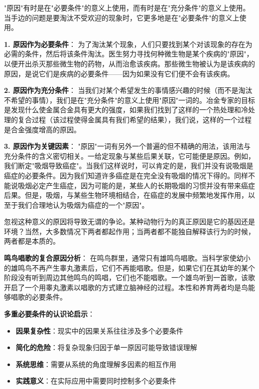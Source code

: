 \begin{theorembox}[title=原因概念的三种基本含义]
"原因"有时是在"必要条件"的意义上使用，而有时是在"充分条件"的意义上使用。当手边的问题是要淘汰不受欢迎的现象时，它更多地是在"必要条件"的意义上使用。

\textbf{1. 原因作为必要条件}：
为了淘汰某个现象，人们只要找到某个对该现象的存在为必需的条件，然后将该条件淘汰。医生努力寻找何种微生物是某个疾病的"原因"，以便开出杀灭那些微生物的药物，从而治愈该疾病。那些微生物被认为是该疾病的原因，是说它们是疾病的必要条件——因为如果没有它们便不会有该疾病。

\textbf{2. 原因作为充分条件}：
当我们对某个希望发生的事情感兴趣的时候（而不是淘汰不希望的事情），我们是在"充分条件"的意义上使用"原因"一词的。冶金专家的目标是发现什么使金属合金具有更大的强度，如果我们找到了这样的一个热处理和冷处理的复合过程（该过程使得金属具有我们希望的结果），我们说，这样的一个过程是合金强度增高的原因。

\textbf{3. 原因作为关键因素}：
"原因"一词有另外一个普遍的但不精确的用法，该用法与充分条件的含义密切相关。一给定现象与某些后果关联，它可能便是原因。例如，我们断定"吸烟导致癌症"。当我们这样说时，可以肯定的是，我们并没有说吸烟是癌症的必要条件。因为我们知道许多癌症是在完全没有吸烟的情况下得的。同样不能说吸烟必定产生癌症，因为可能的是，某些人的长期吸烟的习惯并没有带来癌症后果。但是，吸烟，与某些生物环境相结合，在癌症的发展中频繁地发挥作用，以至于我们合理地认为吸烟为癌症的一个"原因"。
\end{theorembox}

\begin{examplebox}[title=生物学中的多重必要条件案例]
忽视这种意义的原因将导致无谓的争论。某种动物行为的真正原因是它的基因还是环境？当然，大多数情况下两者都起作用；当两者都不能独自解释该行为的时候，两者都是本质的。

\textbf{鸣鸟唱歌的复合原因分析}：
在鸣鸟群里，通常只有雄鸣鸟唱歌。当科学家使幼小的雄鸣鸟不再产生睾丸激素后，它们不再能唱歌。但是，如果它们在其幼年的某个阶段没有听到周边其他鸣鸟的鸣唱，它们也不能唱歌。一个雄鸟听到一首歌，该歌开启了一个用睾丸激素以唱歌的方式建立脑神经的过程。本性和养育两者均是鸟能够唱歌的必要条件。\cite{marler1991}

\textbf{多重必要条件的认识论启示}：
\begin{itemize}
\item \textbf{因果复杂性}：现实中的因果关系往往涉及多个必要条件
\item \textbf{简化的危险}：将复杂现象归因于单一原因可能导致错误理解
\item \textbf{系统思维}：需要从系统的角度理解多因素的相互作用
\item \textbf{实践意义}：在实际应用中需要同时控制多个必要条件
\end{itemize}
\end{examplebox}

